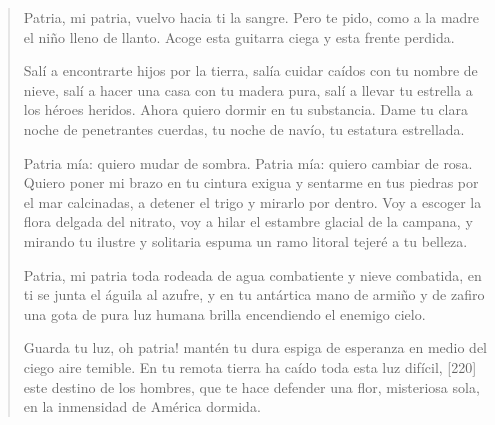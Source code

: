 \documentclass[12pt]{article}
\begin{document}
\clearpage
{}
\begin{verse}
Patria, mi patria, vuelvo hacia ti la sangre.
Pero te pido, como a la madre el niño
lleno de llanto.
	 Acoge
esta guitarra ciega
y esta frente perdida.

Salí a encontrarte hijos por la tierra,
salía cuidar caídos con tu nombre de nieve,
salí a hacer una casa con tu madera pura,
salí a llevar tu estrella a los héroes heridos.
Ahora quiero dormir en tu substancia.
Dame tu clara noche de penetrantes cuerdas,
tu noche de navío, tu estatura estrellada.

Patria mía: quiero mudar de sombra.
Patria mía: quiero cambiar de rosa.
Quiero poner mi brazo en tu cintura exigua
y sentarme en tus piedras por el mar calcinadas,
a detener el trigo y mirarlo por dentro.
Voy a escoger la flora delgada del nitrato,
voy a hilar el estambre glacial de la campana,
y mirando tu ilustre y solitaria espuma
un ramo litoral tejeré a tu belleza.

Patria, mi patria
toda rodeada de agua combatiente
y nieve combatida,
en ti se junta el águila al azufre,
y en tu antártica mano de armiño y de zafiro
una gota de pura luz humana
brilla encendiendo el enemigo cielo.

Guarda tu luz, oh patria! mantén
tu dura espiga de esperanza en medio
del ciego aire temible.
En tu remota tierra ha caído toda esta luz difícil, [220]
este destino de los hombres,
que te hace defender una flor, misteriosa
sola, en la inmensidad de América dormida.

\end{verse}
\end{document}
